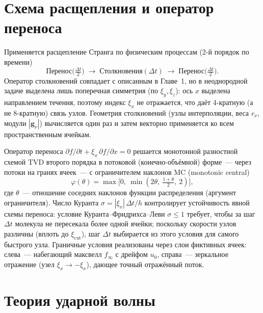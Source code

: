 \documentclass[14pt,a4paper]{extreport}
\numberwithin{equation}{chapter}
\numberwithin{figure}{chapter}
\numberwithin{table}{chapter}
\newcommand{\gv}{\mathbf{g}}
\begin{document}
\section{Схема расщепления и оператор переноса}

Применяется расщепление Странга по физическим процессам (2-й порядок по времени)
\begin{equation}
    \text{Перенос}\Big(\tfrac{\Delta t}{2}\Big)\;\to\;
    \text{Столкновения}(\Delta t)\;\to\;
    \text{Перенос}\Big(\tfrac{\Delta t}{2}\Big).
\end{equation}
Оператор столкновений совпадает с описанным в Главе~1, но в неоднородной задаче выделена лишь поперечная симметрия (по
$\xi_y,\xi_z$): ось $x$ выделена направлением течения, поэтому индекс $\xi_x$ не отражается, что даёт 4-кратную (а не
8-кратную) связь узлов.
Геометрия столкновений (узлы интерполяции, веса $r_\nu$, модули $|\gv_\nu|$) вычисляется один раз и затем векторно
применяется ко всем пространственным ячейкам.

Оператор переноса $\partial f/\partial t+\xi_x\,\partial f/\partial x=0$ решается монотонной разностной схемой TVD
второго порядка в потоковой (конечно-объёмной) форме~--- через потоки на гранях ячеек~--- с ограничителем наклонов MC
(monotonic central)
\begin{equation}
    \varphi(\theta)=\max\!\big[0,\ \min(2\theta,\ \tfrac{1+\theta}{2},\ 2)\big],
\end{equation}
где $\theta$~--- отношение соседних наклонов функции распределения (аргумент ограничителя).
Число Куранта $\sigma=|\xi_x|\,\Delta t/h$ контролирует устойчивость явной схемы переноса: условие
Куранта--Фридрихса--Леви $\sigma\le1$ требует, чтобы за шаг $\Delta t$ молекула не пересекала более одной ячейки;
поскольку скорости узлов различны (вплоть до $\xi_{\mathrm{cut}}$), шаг $\Delta t$ выбирается из этого условия для
самого быстрого узла.
Граничные условия реализованы через слои фиктивных ячеек: слева~--- набегающий максвелл $f_\infty$ с дрейфом $u_0$,
справа~--- зеркальное отражение (узел $\xi_x\to-\xi_x$), дающее точный отражённый поток.

\section{Теория ударной волны}
\end{document}
